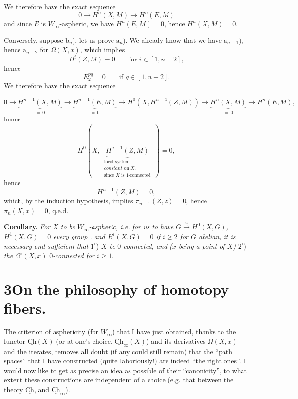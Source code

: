 \documentclass[11pt]{article}
\newcommand{\printedpage}[1]{\marginpar{\footnotesize p.~#1}}
\newcommand{\msp}[1]{\marginpar{\footnotesize [#1]}}
\newcommand{\Ch}{\underline{\mathrm{Ch}}}
\begin{document}
\printedpage{126}

We therefore have the exact sequence
\[
0 \longrightarrow H^n(X,M) \longrightarrow H^n(E,M)
\]
and since $E$ is $W_\infty$-aspheric, we have $H^n(E,M) = 0$, hence $H^n(X,M) = 0$.

Conversely, suppose $\mathrm{b}_n$), let us prove $\mathrm{a}_n$). We already know that we have $\mathrm{a}_{n-1}$), hence $\mathrm{a}_{n-2}$ for $\Omega(X,x)$, which implies
\[
H^i(Z,M) = 0 \qquad \text{for } i \in [1,n-2],
\]
hence
\[
E_2^{pq} = 0 \qquad \text{if } q \in [1,n-2].
\]
We therefore have the exact sequence

\msp{page 190}
\[
0 \longrightarrow \underbrace{H^{n-1}(X,M)}_{=\,0} \longrightarrow \underbrace{H^{n-1}(E,M)}_{=\,0} \longrightarrow H^0(X,H^{n-1}(Z,M)) \longrightarrow \underbrace{H^n(X,M)}_{=\,0} \longrightarrow H^n(E,M),
\]
hence
\[
H^0(X,\ \underbrace{H^{n-1}(Z,M)}_{\begin{array}{l}\text{local system}\\ \textit{constant}\text{ on } X,\\ \text{since } X \text{ is 1-connected}\end{array}}\ ) = 0,
\]
hence
\[
H^{n-1}(Z,M) = 0,
\]
which, by the induction hypothesis, implies $\pi_{n-1}(Z,z) = 0$, hence $\pi_n(X,x) = 0$, q.e.d.

\textbf{Corollary.} \textit{For $X$ to be $W_\infty$-aspheric, i.e. for us to have $G \xrightarrow{\ \sim\ } H^0(X,G)$, $H^1(X,G) = 0$} \textit{every group} \textit{, and $H^i(X,G) = 0$ if $i \geq 2$ for $G$ abelian, it is necessary and sufficient that} $1^\circ$) \textit{$X$ be} $0$\textit{-connected, and ($x$ being a point of $X$)} $2^\circ$) \textit{the $\Omega^i(X,x)$} $0$\textit{-connected for $i \geq 1$.}

\msp{page 191}

\section*{3\quad On the philosophy of homotopy fibers.}

The criterion of asphericity (for $W_\infty$) that I have just obtained, thanks to the functor $\Ch(X)$ (or at one's choice, $\Ch_\infty(X)$) and its derivatives $\Omega(X,x)$ and the iterates, removes all doubt (if any could still remain) that the ``path spaces'' that I have constructed (quite laboriously!) are indeed ``the right ones''. I would now like to get as precise an idea as possible of their ``canonicity'', to what extent these constructions are independent of a choice (e.g. that between the theory $\Ch$, and $\Ch_\infty$). %
\end{document}
